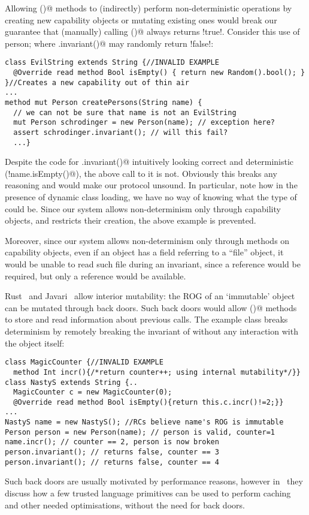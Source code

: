  Allowing \Q@invariant()@ methods to (indirectly) perform non-deterministic operations by creating new capability objects or mutating existing ones would break our guarantee that (manually) calling \Q@invariant()@ always returns \Q!true!.
Consider this use of person; where \Q@myPerson.invariant()@ may randomly return \Q!false!:
\begin{lstlisting}[morekeywords={assert}]
class EvilString extends String {//INVALID EXAMPLE
  @Override read method Bool isEmpty() { return new Random().bool(); }
}//Creates a new capability out of thin air
...
method mut Person createPersons(String name) {
  // we can not be sure that name is not an EvilString
  mut Person schrodinger = new Person(name); // exception here?
  assert schrodinger.invariant(); // will this fail?
  ...}
\end{lstlisting}
Despite the code for \Q@Person.invariant()@ intuitively looking correct and deterministic (\Q@!name.isEmpty()@), the above call to it is not. Obviously this breaks any reasoning and would make our protocol unsound. 
In particular, note how in the presence of dynamic class loading, we have no way of knowing what the type of \Q@name@ could be. Since our system allows non-determinism only through capability objects, and 
restricts their creation, the above example is prevented.

Moreover, since our system allows  
non-determinism only through \Q@mut@ methods on capability objects, 
even if an object has a \Q@capsule@ field referring to a ``file'' object, it would be unable to read such file during an invariant, since a \Q@mut@ reference would be required, but only a \Q@read@ reference would be available.

Rust~\cite{matsakis2014rust} and Javari~\cite{TschantzErnst05}
allow interior mutability:
the ROG of an `immutable' object can be mutated through back doors.
Such back doors would allow \Q@invariant()@ methods to store and read information about previous calls.
The example class \Q@MagicCounter@ breaks determinism by
remotely breaking the invariant of \Q@person@ without any interaction with the \Q@person@ object itself:
\begin{lstlisting}
class MagicCounter {//INVALID EXAMPLE
  method Int incr(){/*return counter++; using internal mutability*/}}
class NastyS extends String {..
  MagicCounter c = new MagicCounter(0);
  @Override read method Bool isEmpty(){return this.c.incr()!=2;}}
...
NastyS name = new NastyS(); //RCs believe name's ROG is immutable
Person person = new Person(name); // person is valid, counter=1
name.incr(); // counter == 2, person is now broken
person.invariant(); // returns false, counter == 3
person.invariant(); // returns false, counter == 4
\end{lstlisting}
Such back doors are usually motivated by performance reasons, however in~\cite{GordonEtAl12} they
discuss how a few trusted language primitives can be used to perform caching and other needed optimisations,
without the need for back doors.


